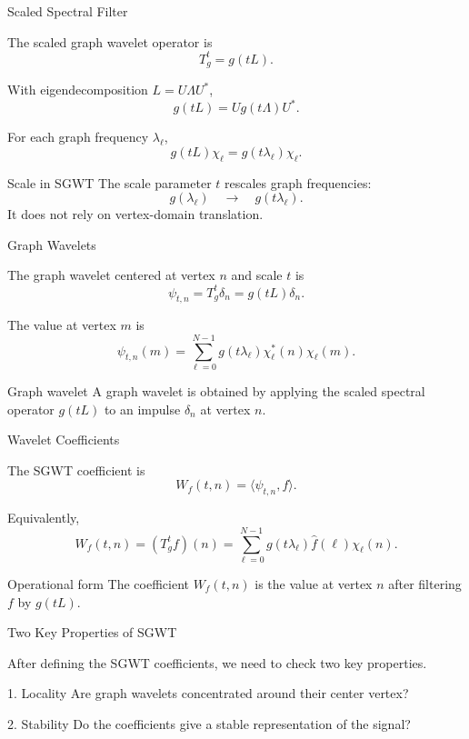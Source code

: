 \documentclass[aspectratio=1610,xcolor=dvipsnames,t]{beamer}
\newcommand{\inner}[2]{\langle #1,#2\rangle}
\begin{document}
\begin{frame}{Scaled Spectral Filter}

The scaled graph wavelet operator is
\[
T_g^t = g(tL).
\]

With eigendecomposition $L = U\Lambda U^*$,
\[
g(tL)
=
U g(t\Lambda) U^*.
\]

For each graph frequency $\lambda_\ell$,
\[
g(tL)\chi_\ell
=
g(t\lambda_\ell)\chi_\ell.
\]

\begin{block}{Scale in SGWT}
The scale parameter $t$ rescales graph frequencies:
\[
g(\lambda_\ell)
\quad\longrightarrow\quad
g(t\lambda_\ell).
\]
It does not rely on vertex-domain translation.
\end{block}

\end{frame}

\begin{frame}{Graph Wavelets}

The graph wavelet centered at vertex $n$ and scale $t$ is
\[
\psi_{t,n}
=
T_g^t\delta_n
=
g(tL)\delta_n.
\tag{SGWT Eq.~23}
\]

The value at vertex $m$ is
\[
\psi_{t,n}(m)
=
\sum_{\ell=0}^{N-1}
g(t\lambda_\ell)\chi_\ell^*(n)\chi_\ell(m).
\tag{SGWT Eq.~24}
\]

\begin{block}{Graph wavelet}
A graph wavelet is obtained by applying the scaled spectral operator $g(tL)$
to an impulse $\delta_n$ at vertex $n$.
\end{block}

\end{frame}

\begin{frame}{Wavelet Coefficients}

The SGWT coefficient is
\[
W_f(t,n)
=
\inner{\psi_{t,n}}{f}.
\tag{SGWT Eq.~25}
\]

Equivalently,
\[
W_f(t,n)
=
(T_g^t f)(n)
=
\sum_{\ell=0}^{N-1}
g(t\lambda_\ell)\widehat f(\ell)\chi_\ell(n).
\tag{SGWT Eq.~26}
\]

\begin{block}{Operational form}
The coefficient $W_f(t,n)$ is the value at vertex $n$ after filtering $f$ by $g(tL)$.
\end{block}

\end{frame}

\begin{frame}{Two Key Properties of SGWT}

After defining the SGWT coefficients, we need to check two key properties.

\begin{block}{1. Locality}
Are graph wavelets concentrated around their center vertex?
\end{block}

\begin{block}{2. Stability}
Do the coefficients give a stable representation of the signal?
\end{block}

\end{frame}
\end{document}
